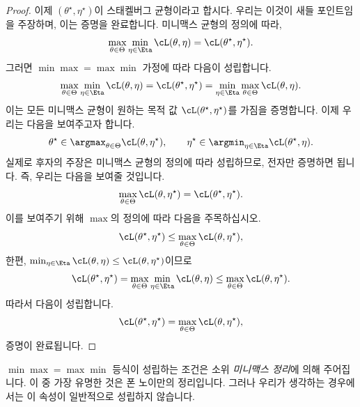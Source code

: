 \documentclass[../../book-main_ko.tex]{subfiles}
\begin{document}
\begin{proof}
    이제 \((\theta^{\star}, \eta^{\star})\)이 스태켈버그 균형이라고 합시다. 우리는 이것이 새들 포인트임을 주장하며, 이는 증명을 완료합니다. 미니맥스 균형의 정의에 따라,
    \begin{equation}
        \max_{\theta \in \Theta}\min_{\eta \in \Eta}\cL(\theta, \eta) = \cL(\theta^{\star}, \eta^{\star}).
    \end{equation}
    그러면 \(\min\max = \max\min\) 가정에 따라 다음이 성립합니다.
    \begin{equation}
        \max_{\theta \in \Theta}\min_{\eta \in \Eta}\cL(\theta, \eta) = \cL(\theta^{\star}, \eta^{\star}) = \min_{\eta \in \Eta}\max_{\theta \in \Theta}\cL(\theta, \eta).
    \end{equation}
    이는 모든 미니맥스 균형이 원하는 목적 값 \(\cL(\theta^{\star}, \eta^{\star})\)를 가짐을 증명합니다. 이제 우리는 다음을 보여주고자 합니다.
    \begin{equation}
        \theta^{\star} \in \argmax_{\theta \in \Theta}\cL(\theta, \eta^{\star}), \qquad \eta^{\star} \in \argmin_{\eta \in \Eta}\cL(\theta^{\star}, \eta).
    \end{equation}
    실제로 후자의 주장은 미니맥스 균형의 정의에 따라 성립하므로, 전자만 증명하면 됩니다. 즉, 우리는 다음을 보여줄 것입니다.
    \begin{equation}
        \max_{\theta \in \Theta}\cL(\theta, \eta^{\star}) = \cL(\theta^{\star}, \eta^{\star}).
    \end{equation}
    이를 보여주기 위해 \(\max\)의 정의에 따라 다음을 주목하십시오.
    \begin{equation}
        \cL(\theta^{\star}, \eta^{\star}) \leq \max_{\theta \in \Theta}\cL(\theta, \eta^{\star}),
    \end{equation}
    한편, \(\min_{\eta \in \Eta}\cL(\theta, \eta) \leq \cL(\theta, \eta^{\star})\)이므로
    \begin{equation}
        \cL(\theta^{\star}, \eta^{\star}) = \max_{\theta \in \Theta}\min_{\eta \in \Eta}\cL(\theta, \eta) \leq \max_{\theta \in \Theta}\cL(\theta, \eta^{\star}).
    \end{equation}
    따라서 다음이 성립합니다.
    \begin{equation}
        \cL(\theta^{\star}, \eta^{\star}) = \max_{\theta \in \Theta}\cL(\theta, \eta^{\star}),
    \end{equation}
    증명이 완료됩니다.
\end{proof}
\(\min\max = \max\min\) 등식이 성립하는 조건은 소위 \textit{미니맥스 정리}에 의해 주어집니다. 이 중 가장 유명한 것은 폰 노이만의 정리입니다. 그러나 우리가 생각하는 경우에서는 이 속성이 일반적으로 성립하지 않습니다.
\end{document}
